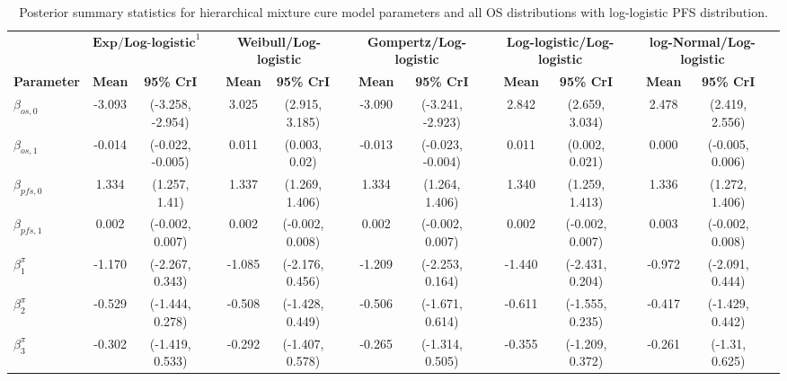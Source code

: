\documentclass[AMA,STIX1COL]{WileyNJD-v2}
\begin{document}
\begin{landscape}
\begin{center}
\begin{table}[t]
\caption{Posterior summary statistics for hierarchical mixture cure model parameters and all OS distributions with log-logistic PFS distribution. \label{tab:post_hier_pfs_llogistic}}
\centering
\begin{tabular}{l c c c c c c c c c c c c c c c}
\toprule
\multicolumn{1}{l}{} & \multicolumn{2}{c}{$\textbf{Exp/Log-logistic}^1$} & & \multicolumn{2}{c}{\textbf{Weibull/Log-logistic}} & & \multicolumn{2}{c}{\textbf{Gompertz/Log-logistic}} & & \multicolumn{2}{c}{\textbf{Log-logistic/Log-logistic}} & & \multicolumn{2}{c}{\textbf{log-Normal/Log-logistic}}\\
\cmidrule{2-3}\cmidrule{5-6}\cmidrule{8-9}\cmidrule{11-12}\cmidrule{14-15}
\textbf{Parameter} & \textbf{Mean} & \textbf{95\% CrI} & & \textbf{Mean} & \textbf{95\% CrI} & & \textbf{Mean} & \textbf{95\% CrI} & & \textbf{Mean} & \textbf{95\% CrI} & & \textbf{Mean} & \textbf{95\% CrI}\\
\midrule
$\beta_{os, 0}$ & -3.093 & (-3.258, -2.954) &  & 3.025 & (2.915, 3.185) &  & -3.090 & (-3.241, -2.923) &  & 2.842 & (2.659, 3.034) &  & 2.478 & (2.419, 2.556) & \\
$\beta_{os, 1}$ & -0.014 & (-0.022, -0.005) &  & 0.011 & (0.003, 0.02) &  & -0.013 & (-0.023, -0.004) &  & 0.011 & (0.002, 0.021) &  & 0.000 & (-0.005, 0.006) & \\
$\beta_{pfs, 0}$ & 1.334 & (1.257, 1.41) &  & 1.337 & (1.269, 1.406) &  & 1.334 & (1.264, 1.406) &  & 1.340 & (1.259, 1.413) &  & 1.336 & (1.272, 1.406) & \\
$\beta_{pfs, 1}$ & 0.002 & (-0.002, 0.007) &  & 0.002 & (-0.002, 0.008) &  & 0.002 & (-0.002, 0.007) &  & 0.002 & (-0.002, 0.007) &  & 0.003 & (-0.002, 0.008) & \\
$\beta^{\pi}_1$ & -1.170 & (-2.267, 0.343) &  & -1.085 & (-2.176, 0.456) &  & -1.209 & (-2.253, 0.164) &  & -1.440 & (-2.431, 0.204) &  & -0.972 & (-2.091, 0.444) & \\
$\beta^{\pi}_2$ & -0.529 & (-1.444, 0.278) &  & -0.508 & (-1.428, 0.449) &  & -0.506 & (-1.671, 0.614) &  & -0.611 & (-1.555, 0.235) &  & -0.417 & (-1.429, 0.442) & \\
$\beta^{\pi}_3$ & -0.302 & (-1.419, 0.533) &  & -0.292 & (-1.407, 0.578) &  & -0.265 & (-1.314, 0.505) &  & -0.355 & (-1.209, 0.372) &  & -0.261 & (-1.31, 0.625) & \\

\end{tabular}
\end{table}
\end{center}
\end{landscape}
\end{document}

